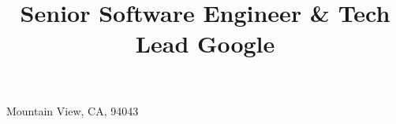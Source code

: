 \title{\normalsize
	Senior Software Engineer & Tech Lead\newline
	Google
}                       %
\address{1600 Amphitheatre Pkwy\\Attn Gdinatale\\}{Mountain View, CA, 94043}    %




\newcommand{\see}[1]{\hfill{\itshape\color{see}\footnotesize{}see #1}}

\newcommand{\br}{\ifinner, \else\\\fi}

\newcommand{\gh}[3]{\href{https://github.com/#1/#2/commits?author=dinatale2}{#3}}
\newcommand{\ghllnl}[2]{\gh{llnl}{#1}{#2}}
\newcommand{\ghzfs}[2]{\gh{zfsonlinux}{#1}{#2}}
\newcommand{\ghopensfs}[2]{\gh{opensfs}{#1}{#2}}
\newcommand{\lustre}[0]{\href{https://review.whamcloud.com/\#/q/owner:dinatale2@llnl.gov+status:merged}{Lustre}}

\makeatletter
\def\@bibitem#1{%
	\def\mykey{#1}%
	\item\if@filesw\immediate\write\@auxout {\string\bibcite{#1}%
	{\the\value{\@listctr}}}\fi\ignorespaces}

